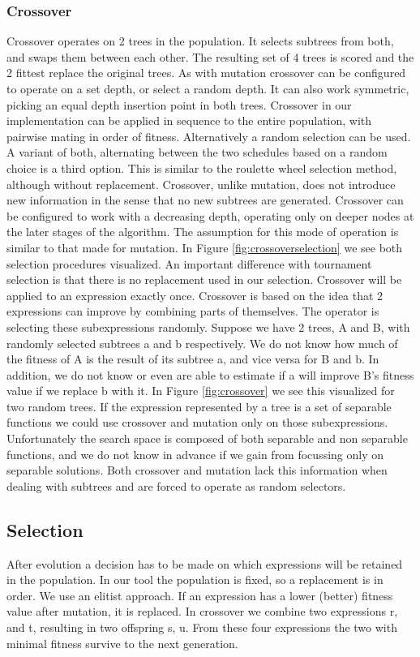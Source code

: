\subsubsection{Crossover}
Crossover operates on 2 trees in the population. It selects subtrees from both, and swaps them between each other. The resulting set of 4 trees is scored and the 2 fittest replace the original trees. As with mutation crossover can be configured to operate on a set depth, or select a random depth. It can also work symmetric, picking an equal depth insertion point in both trees.
Crossover in our implementation can be applied in sequence to the entire population, with pairwise mating in order of fitness. Alternatively a random selection can be used. A variant of both, alternating between the two schedules based on a random choice is a third option. This is similar to the roulette wheel selection method, although without replacement.
Crossover, unlike mutation, does not introduce new information in the sense that no new subtrees are generated.
Crossover can be configured to work with a decreasing depth, operating only on deeper nodes at the later stages of the algorithm. The assumption for this mode of operation is similar to that made for mutation.
In Figure \ref{fig:crossoverselection} we see both selection procedures visualized. An important difference with tournament selection is that there is no replacement used in our selection. Crossover will be applied to an expression exactly once.
Crossover is based on the idea that 2 expressions can improve by combining parts of themselves. The operator is selecting these subexpressions randomly. Suppose we have 2 trees, A and B, with randomly selected subtrees a and b respectively. We do not know how much of the fitness of A is the result of its subtree a, and vice versa for B and b. In addition, we do not know or even are able to estimate if a will improve B's fitness value if we replace b with it. In Figure \ref{fig:crossover} we see this visualized for two random trees.
If the expression represented by a tree is a set of separable functions we could use crossover and mutation only on those subexpressions. Unfortunately the search space is composed of both separable and non separable functions, and we do not know in advance if we gain from focussing only on separable solutions. Both crossover and mutation lack this information when dealing with subtrees and are forced to operate as random selectors.

\subsection{Selection}
After evolution a decision has to be made on which expressions will be retained in the population. In our tool the population is fixed, so a replacement is in order. We use an elitist approach. If an expression has a lower (better) fitness value after mutation, it is replaced.
In crossover we combine two expressions r, and t, resulting in two offspring s, u.
From these four expressions the two with minimal fitness survive to the next generation.

